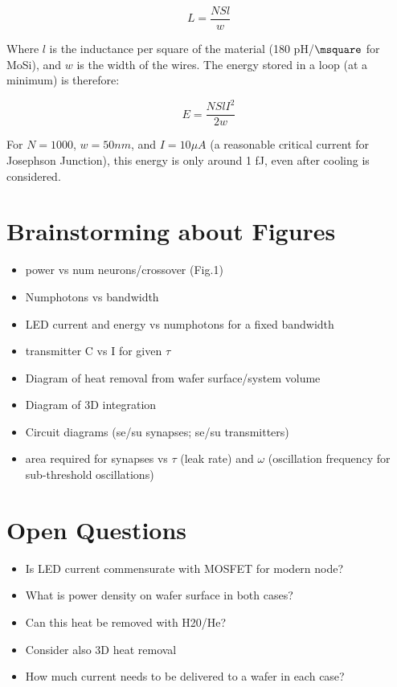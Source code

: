 \documentclass{article}
\begin{document}
\begin{equation}
    L = \frac{NSl}{w}
\end{equation}

Where $l$ is the inductance per square of the material (180 pH/$\msquare$ for MoSi), and $w$ is the width of the wires. The energy stored in a loop (at a minimum) is therefore:

\begin{equation}
    E = \frac{NSlI^2}{2w}
\end{equation}

For $N=1000$, $w=50 nm$, and $I=10\mu A$ (a reasonable critical current for Josephson Junction), this energy is only around 1 fJ, even after cooling is considered.

\section{Brainstorming about Figures}
\begin{itemize}
    \item power vs num neurons/crossover (Fig.1)
    \item Numphotons vs bandwidth
    \item LED current and energy vs numphotons for a fixed bandwidth
    \item transmitter C vs I for given $\tau$
    \item Diagram of heat removal from wafer surface/system volume
    \item Diagram of 3D integration
    \item Circuit diagrams (se/su synapses; se/su transmitters)
    \item area required for synapses vs $\tau$ (leak rate) and $\omega$ (oscillation frequency for sub-threshold oscillations)
\end{itemize}

\section{Open Questions}
\begin{itemize}
    \item Is LED current commensurate with MOSFET for modern node?
    \item What is power density on wafer surface in both cases?
    \item Can this heat be removed with H20/He?
    \item Consider also 3D heat removal
    \item How much current needs to be delivered to a wafer in each case?
\end{itemize}
\end{document}
